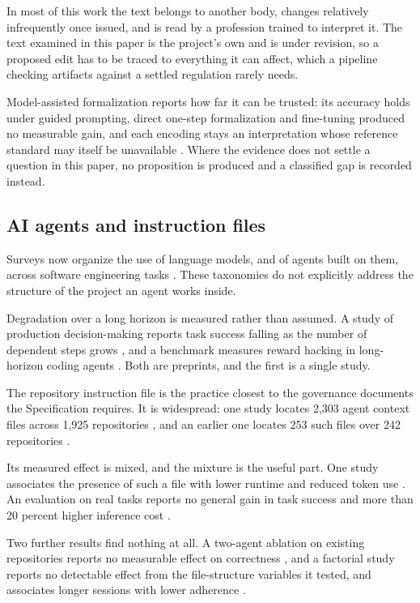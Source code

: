 In most of this work the text belongs to another body, changes relatively infrequently once issued, and is read by a profession trained to interpret it. The text examined in this paper is the project's own and is under revision, so a proposed edit has to be traced to everything it can affect, which a pipeline checking artifacts against a settled regulation rarely needs.

Model-assisted formalization reports how far it can be trusted: its accuracy holds under guided prompting, direct one-step formalization and fine-tuning produced no measurable gain, and each encoding stays an interpretation whose reference standard may itself be unavailable \citep[Sections~5.1 and~6]{horner2025}. Where the evidence does not settle a question in this paper, no proposition is produced and a classified gap is recorded instead.

\subsection{AI agents and instruction files}

Surveys now organize the use of language models, and of agents built on them, across software engineering tasks \citep{hou2024, liu2024}. These taxonomies do not explicitly address the structure of the project an agent works inside.

Degradation over a long horizon is measured rather than assumed. A study of production decision-making reports task success falling as the number of dependent steps grows \citep{mittal2026}, and a benchmark measures reward hacking in long-horizon coding agents \citep{specbench2026}. Both are preprints, and the first is a single study.

The repository instruction file is the practice closest to the governance documents the Specification requires. It is widespread: one study locates 2,303 agent context files across 1,925 repositories \citep{chatlatanagulchai2025readme}, and an earlier one locates 253 such files over 242 repositories \citep{chatlatanagulchai2025manifests}.

Its measured effect is mixed, and the mixture is the useful part. One study associates the presence of such a file with lower runtime and reduced token use \citep{lulla2026}. An evaluation on real tasks reports no general gain in task success and more than 20 percent higher inference cost \citep{gloaguen2026}.

Two further results find nothing at all. A two-agent ablation on existing repositories reports no measurable effect on correctness \citep{khatri2026}, and a factorial study reports no detectable effect from the file-structure variables it tested, and associates longer sessions with lower adherence \citep{mcmillan2026}.

